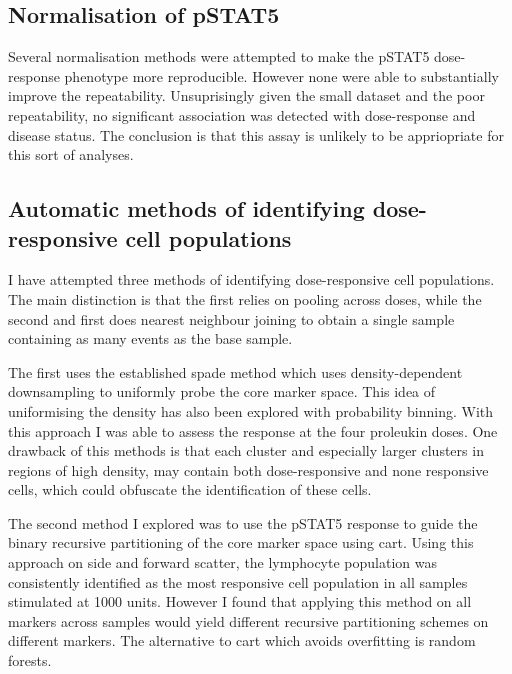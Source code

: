 
\subsection{Normalisation of pSTAT5}

Several normalisation methods were attempted to make the pSTAT5 dose-response phenotype more reproducible.
However none were able to substantially improve the repeatability.
Unsuprisingly given the small dataset and the poor repeatability, no significant association was detected with dose-response
and disease status.
The conclusion is that this assay is unlikely to be appriopriate for this sort of analyses.


\subsection{ Automatic methods of identifying dose-responsive cell populations }

I have attempted three methods of identifying dose-responsive cell populations.
The main distinction is that the first relies on pooling across doses, while the second and first does nearest neighbour joining to obtain a single sample
containing as many events as the base sample.

The first uses the established spade method which uses density-dependent downsampling to uniformly probe the core marker space.
This idea of uniformising the density has also been explored with probability binning.
With this approach I was able to assess the response at the four proleukin doses.
One drawback of this methods is that each cluster and especially larger clusters in regions of high density, may contain both dose-responsive and none responsive cells,
which could obfuscate the identification of these cells.

The second method I explored was to use the pSTAT5 response to guide the binary recursive partitioning of the core marker space using cart.
Using this approach on side and forward scatter, the lymphocyte population was consistently identified as the most responsive cell population in all samples
stimulated at 1000 units.
However I found that applying this method on all markers across samples would yield different recursive partitioning schemes on different markers.
The alternative to cart which avoids overfitting is random forests.

